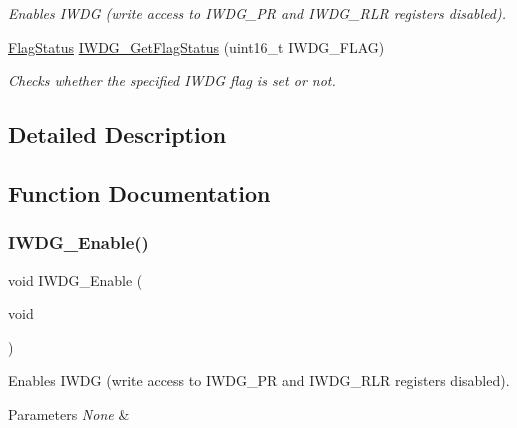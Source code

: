 \begin{DoxyCompactItemize}
\begin{DoxyCompactList}\small\item\em Enables I\+W\+DG (write access to I\+W\+D\+G\+\_\+\+PR and I\+W\+D\+G\+\_\+\+R\+LR registers disabled). \end{DoxyCompactList}\item 
\mbox{\hyperlink{group___exported__types_ga89136caac2e14c55151f527ac02daaff}{Flag\+Status}} \mbox{\hyperlink{group___i_w_d_g___private___functions_ga37f050cfbedc0c15f9e0816c0b22011e}{I\+W\+D\+G\+\_\+\+Get\+Flag\+Status}} (uint16\+\_\+t I\+W\+D\+G\+\_\+\+F\+L\+AG)
\begin{DoxyCompactList}\small\item\em Checks whether the specified I\+W\+DG flag is set or not. \end{DoxyCompactList}\end{DoxyCompactItemize}


\subsection{Detailed Description}


\subsection{Function Documentation}
\mbox{\label{group___i_w_d_g___private___functions_ga479b2921c86f8c67b819f5c4bea6bdb6}} 
\subsubsection{\texorpdfstring{IWDG\_Enable()}{IWDG\_Enable()}}
{\footnotesize\ttfamily void I\+W\+D\+G\+\_\+\+Enable (\begin{DoxyParamCaption}\item[{void}]{ }\end{DoxyParamCaption})}



Enables I\+W\+DG (write access to I\+W\+D\+G\+\_\+\+PR and I\+W\+D\+G\+\_\+\+R\+LR registers disabled). 


\begin{DoxyParams}{Parameters}
{\em None} & \\
\hline
\end{DoxyParams}

